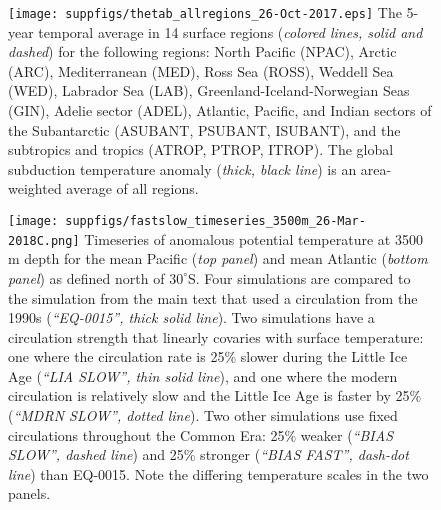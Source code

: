 \documentclass[12pt]{article}
\begin{document}
\begin{figure}%
\begin{center}
\texttt{[image: suppfigs/thetab\_allregions\_26-Oct-2017.eps]}
 The 5-year temporal average in 14 surface regions ({\it colored lines, solid and dashed}) for the following regions: North Pacific (NPAC), Arctic (ARC), Mediterranean (MED), Ross Sea (ROSS), Weddell Sea (WED), Labrador Sea (LAB), Greenland-Iceland-Norwegian Seas (GIN), Adelie sector (ADEL), Atlantic, Pacific, and Indian sectors of the Subantarctic (ASUBANT, PSUBANT, ISUBANT), and the subtropics and tropics (ATROP, PTROP, ITROP). The global subduction temperature anomaly ({\it thick, black line}) is an area-weighted average of all regions.
\end{center} 
\end{figure}

\begin{figure}%
\begin{center}
\texttt{[image: suppfigs/fastslow\_timeseries\_3500m\_26-Mar-2018C.png]}
 Timeseries of anomalous potential temperature at 3500 m depth for the mean Pacific ({\it top panel}) and mean Atlantic ({\it bottom panel}) as defined north of $30^{\circ}$S. Four simulations are compared to the simulation from the main text that used a circulation from the 1990s ({\it ``EQ-0015'', thick solid line}). Two simulations have a circulation strength that linearly covaries with surface temperature:  one where the circulation rate is 25\% slower during the Little Ice Age ({\it ``LIA SLOW'', thin solid line}), and one where the modern circulation is relatively slow and the Little Ice Age is faster by 25\% ({\it ``MDRN SLOW'', dotted line}). Two other simulations use fixed circulations throughout the Common Era: 25\% weaker ({\it ``BIAS SLOW'', dashed line}) and 25\% stronger ({\it ``BIAS FAST'', dash-dot line}) than EQ-0015. Note the differing temperature scales in the two panels.
\end{center} 
\end{figure}

\end{document}
